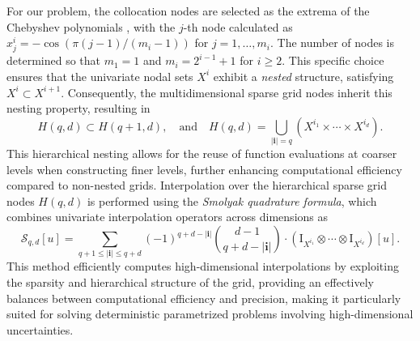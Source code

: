 For our problem, the collocation nodes are selected as the extrema of the Chebyshev polynomials \cite{BaNoRi:2000, ClCu:1960}, with the $j$-th node calculated as $x_j^i=-\cos (\pi(j-1)/(m_i-1))$ for $j=1, \ldots, m_i$. The number of nodes is determined so that $m_1 =1$ and $m_i = 2^{i-1}+1$ for $i\ge 2$. This specific choice ensures that the univariate nodal sets $X^i$ exhibit a {\it nested} structure, satisfying $X^i\subset X^{i+1}$. Consequently, the multidimensional sparse grid nodes inherit this nesting property,  resulting in
%
\begin{equation}
\label{eq:NestedColPts}
H(q,d)\subset H(q+1,d),\quad \text{and}\quad H(q,d) = \bigcup_{|\boldsymbol{i}|=q} \left(X^{i_1}\times \cdots\times X^{i_d}\right).
\end{equation}
%
This hierarchical nesting allows for the reuse of function evaluations at coarser levels when constructing finer levels, further enhancing computational efficiency compared to non-nested grids. Interpolation over the hierarchical sparse grid nodes $H(q,d)$ is performed using the {\it Smolyak quadrature formula}, which combines univariate interpolation operators across dimensions as
%
\begin{equation}
\label{eq: Smolyak_Quad_formula}
\mathcal{S}_{q, d}[u] = \sum_{q+1\le |\boldsymbol{i}|\le q+d} (-1)^{q+d-|\boldsymbol{i}|} \binom{d-1}{q+d-|\boldsymbol{i}|}\cdot \left(\mathrm I_{X^{i_1}}\otimes\cdots\otimes \mathrm I_{X^{i_d}}\right) [u].
\end{equation} 
%
This method efficiently computes high-dimensional interpolations by exploiting the sparsity and hierarchical structure of the grid, providing an effectively balances between computational efficiency and precision, making it particularly suited for solving deterministic parametrized problems involving high-dimensional uncertainties.





